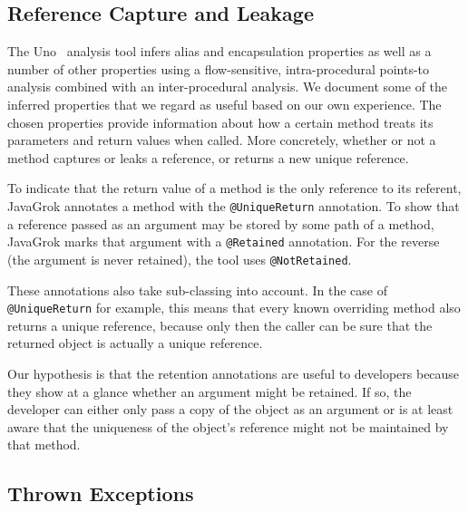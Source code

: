 

\subsection{Reference Capture and Leakage}

The Uno~\cite{Uno} analysis tool infers alias and encapsulation properties as well as a number
of other properties using a flow-sensitive,
intra-procedural points-to analysis combined with an inter-procedural analysis.
We document some of the inferred properties that we regard as useful
based on our own experience. The chosen properties 
provide information about how a certain method treats its parameters and 
return values when called. More concretely, whether or not a 
method captures or leaks a reference, or returns a new unique reference.

To indicate that the return value of a method is the only reference to its
referent, JavaGrok annotates a method with the \texttt{@UniqueReturn}
annotation.  To show that a reference passed as an argument may be stored by
some path of a method, JavaGrok marks that argument with a \texttt{@Retained}
annotation.  For the reverse (the argument is never retained), the tool uses
\texttt{@NotRetained}.

These annotations also take sub-classing into account. In the case of
\texttt{@UniqueReturn} for example, this means that every known overriding method
also returns a unique reference, because only then the caller can be sure
that the returned object is actually a unique reference.

Our hypothesis is that the retention annotations are useful to developers
because they show at a glance whether an argument
might be retained. If so, the developer can either only
pass a copy of the object as an argument or is at least aware that the uniqueness
of the object's reference might not be maintained by that method.

\subsection{Thrown Exceptions}

